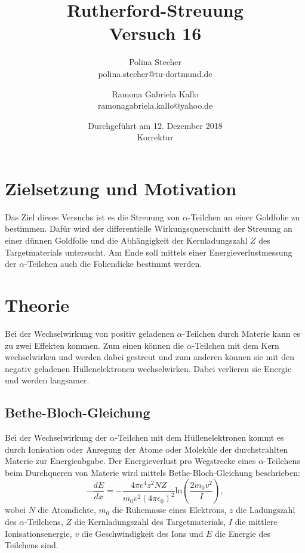 \documentclass{article}
\begin{document}
	
	
	
	\scriptsize \normalsize
\title{Rutherford-Streuung \\ Versuch 16}



\author{Polina Stecher\\ {polina.stecher@tu-dortmund.de} \and Ramona Gabriela Kallo \\{ramonagabriela.kallo@yahoo.de} } %
\date{Durchgeführt am 12. Dezember 2018\\Korrektur}
\maketitle
\newpage

\tableofcontents
\thispagestyle{empty}
	\newpage 
	
\section{Zielsetzung und Motivation}
\label{sec:ZielsetzungundMotivation}
Das Ziel dieses Versuchs ist es die Streuung von $\alpha$-Teilchen an einer Goldfolie zu bestimmen. Dafür wird der differentielle Wirkungsquerschnitt der Streuung an einer dünnen Goldfolie und die Abhängigkeit der Kernladungszahl $Z$ des Targetmaterials untersucht.
Am Ende soll mittels einer Energieverlustmessung der $\alpha$-Teilchen auch die Foliendicke bestimmt werden.

\section{Theorie}
\label{sec:Theorie}
Bei der Wechselwirkung von positiv geladenen $\alpha$-Teilchen durch Materie kann es zu zwei Effekten kommen. Zum einen können die $\alpha$-Teilchen mit dem Kern wechselwirken und werden dabei gestreut und zum anderen können sie mit den negativ geladenen Hüllenelektronen wechselwirken. Dabei verlieren sie Energie und werden langsamer. 

\subsection{Bethe-Bloch-Gleichung}
Bei der Wechselwirkung der $\alpha$-Teilchen mit dem Hüllenelektronen kommt es durch Ionisation oder Anregung der Atome oder Moleküle der durchstrahlten Materie zur Energieabgabe. Der Energieverlust pro Wegstrecke eines $\alpha$-Teilchens beim Durchqueren von Materie wird mittels Bethe-Bloch-Gleichung beschrieben:
\begin{equation}
\label{eq:bethebloch}
-\frac{dE}{dx} = - \frac{4 \pi e^4 z^2 N Z}{m_0 v^2 (4\pi\epsilon_0)^2}\text{ln}\left(\frac{2 m_0 v^2}{I}\right),
\end{equation}
wobei $N$ die Atomdichte, $m_0$ die Ruhemasse eines Elektrons, $z$ die Ladungszahl des $\alpha$-Teilchens, $Z$ die Kernladungszahl des Targetmaterials, $I$ die mittlere Ionisationsenergie, $v$ die Geschwindigkeit des Ions und $E$ die Energie des Teilchens sind.
\end{document}
